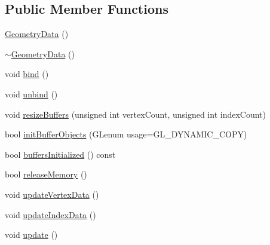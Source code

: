\subsection*{Public Member Functions}
\begin{DoxyCompactItemize}
\item 
\mbox{\hyperlink{structec_1_1_geometry_data_a21db28a4c6d964c8bc59cc698170e77c}{Geometry\+Data}} ()
\item 
\mbox{\hyperlink{structec_1_1_geometry_data_ab0684d232286015d10fb40ab49836c84}{$\sim$\+Geometry\+Data}} ()
\item 
void \mbox{\hyperlink{structec_1_1_geometry_data_acb50971e6fbd928172731a3427d22691}{bind}} ()
\item 
void \mbox{\hyperlink{structec_1_1_geometry_data_abb54af4b2922eb16973b450d6cf0beae}{unbind}} ()
\item 
void \mbox{\hyperlink{structec_1_1_geometry_data_a85ce34e18732d88632310d751a6c2cee}{resize\+Buffers}} (unsigned int vertex\+Count, unsigned int index\+Count)
\item 
bool \mbox{\hyperlink{structec_1_1_geometry_data_a5a3ba60e2d48de04706168229bdfa87d}{init\+Buffer\+Objects}} (G\+Lenum usage=G\+L\+\_\+\+D\+Y\+N\+A\+M\+I\+C\+\_\+\+C\+O\+PY)
\item 
bool \mbox{\hyperlink{structec_1_1_geometry_data_a23c0090061b5b21b74f070916915ca69}{buffers\+Initialized}} () const
\item 
bool \mbox{\hyperlink{structec_1_1_geometry_data_a5df7921c489c60d96a971003c299dcb3}{release\+Memory}} ()
\item 
void \mbox{\hyperlink{structec_1_1_geometry_data_aeb93c2e5bd5f4656eaa12651cd4927aa}{update\+Vertex\+Data}} ()
\item 
void \mbox{\hyperlink{structec_1_1_geometry_data_a23fd4a2619691fb7bbd5c0650544cce3}{update\+Index\+Data}} ()
\item 
void \mbox{\hyperlink{structec_1_1_geometry_data_ad8edfa8a7fda52850f072ab845ef38fd}{update}} ()
\end{DoxyCompactItemize}
